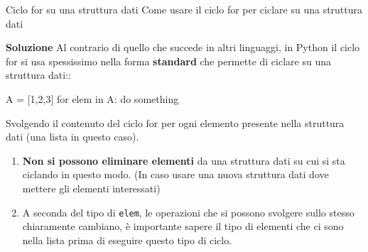 \documentclass[10pt]{extarticle}
\makeatletter
\newcommand{\<}{\langle}
\renewcommand{\>}{\rangle}
\renewenvironment{proof}[1][\proofname] {\par\pushQED{\qed}
\renewcommand*{\proofname}{Soluzione}
{\normalfont\sffamily\bfseries\topsep6\p@\@plus6\p@\relax #1\@addpunct{.} }}{\popQED\endtrivlist\@endpefalse}
\theoremstyle{mystyle}{\newtheorem*{remark}{Nota}}
\theoremstyle{mystyle}{\newtheorem*{remarks}{Note}}
\theoremstyle{mystyle}{\newtheorem*{example}{Esempio}}
\theoremstyle{mystyle}{\newtheorem*{examples}{Esempi}}
\theoremstyle{definition}{\newtheorem*{exercise}{Exercise}}
\theoremstyle{warn}
\makeatother
\begin{document}
\begin{definition}{Ciclo for su una struttura dati}{}
Come usare il ciclo for per ciclare su una struttura dati
\end{definition}
\begin{proof}
Al contrario di quello che succede in altri linguaggi, in Python il ciclo for si usa spessissimo nella forma \textbf{standard} che permette di ciclare su una struttura dati::
\begin{python}
A = [1,2,3]
for elem in A:
    do something
\end{python}
Svolgendo il contenuto del ciclo for per ogni elemento presente nella struttura dati (una lista in questo caso).
\end{proof}
\begin{remarks} \leavevmode
\begin{enumerate}
    \item \textbf{Non si possono eliminare elementi} da una struttura dati su cui si sta ciclando in questo modo. (In caso usare una nuova struttura dati dove mettere gli elementi interessati)
    \item A seconda del tipo di \texttt{elem}, le operazioni che si possono svolgere sullo stesso chiaramente cambiano, è importante sapere il tipo di elementi che ci sono nella lista prima di eseguire questo tipo di ciclo.
\end{enumerate}
\end{remarks}
\end{document}

